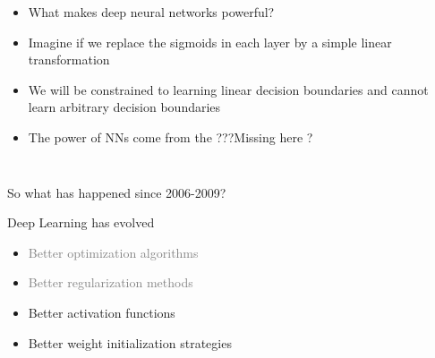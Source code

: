 \begin{frame}
	\begin{columns}
				
		\begin{itemize}[<+(1)->]
			\justifying
			\item What makes deep neural networks powerful?
			\item Imagine if we replace the sigmoids in each layer by a simple linear transformation
			\item We will be constrained to learning linear decision boundaries and cannot learn arbitrary decision boundaries
			\item The power of NNs come from the ???Missing here ?
		\end{itemize}
		
		
		\begin{overlayarea}{\textwidth}{\textheight}
						
			\begin{center}
				
			\end{center}
						
		\end{overlayarea}
	\end{columns}
\end{frame}
\fi

\begin{frame}
	\begin{center}
		So what has happened since 2006-2009?
		
	\end{center}
	    
\end{frame}


\begin{frame}
	\begin{block}{Deep Learning has evolved}
		\begin{itemize}[<+->]
			\justifying
			\item \textcolor{gray}{Better optimization algorithms}
			\item \textcolor{gray}{Better regularization methods}
			\item Better activation functions
			\item Better weight initialization strategies
		\end{itemize}
		
	\end{block}
\end{frame}